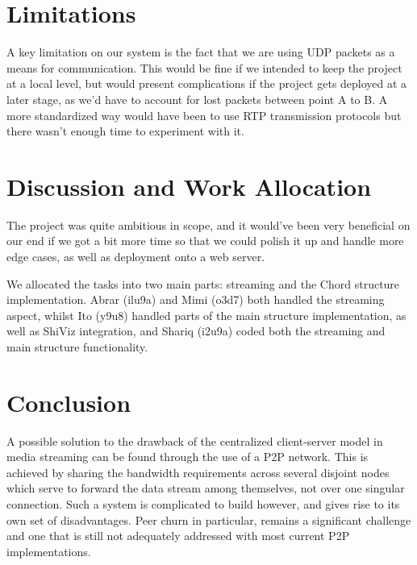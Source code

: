 \documentclass[fleqn,24pt]{SelfArx} %
\begin{document}
\section{Limitations}

A key limitation on our system is the fact that we are using UDP packets as a means for communication. This would be fine if we intended to keep the project at a local level, but would present complications if the project gets deployed at a later stage, as we'd have to account for lost packets between point A to B. A more standardized way would have been to use RTP transmission protocols but there wasn't enough time to experiment with it. 

\section{Discussion and Work Allocation}

The project was quite ambitious in scope, and it would've been very beneficial on our end if we got a bit more time so that we could polish it up and handle more edge cases, as well as deployment onto a web server. 

We allocated the tasks into two main parts: streaming and the Chord structure implementation. Abrar (ilu9a) and Mimi (o3d7) both handled the streaming aspect, whilst Ito (y9u8) handled parts of the main structure implementation, as well as ShiViz integration, and Shariq (i2u9a) coded both the streaming and main structure functionality.


\section{Conclusion}

A possible solution to the drawback of the centralized client-server model in media streaming can be found through the use of a P2P network. This is achieved by sharing the bandwidth requirements across several disjoint nodes which serve to forward the data stream among themselves, not over one singular connection. Such a system is complicated to build however, and gives rise to its own set of disadvantages. Peer churn in particular, remains a significant challenge and one that is still not adequately addressed with most current P2P implementations.




\end{document}

